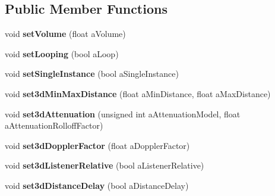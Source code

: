\subsection*{Public Member Functions}
\begin{DoxyCompactItemize}
\item 
\mbox{\label{class_so_loud_1_1_audio_source_a131aebb933216574269ce7f394b95b37}} 
void {\bfseries set\+Volume} (float a\+Volume)
\item 
\mbox{\label{class_so_loud_1_1_audio_source_ad62577bf3b28507cf00fec8122ed3699}} 
void {\bfseries set\+Looping} (bool a\+Loop)
\item 
\mbox{\label{class_so_loud_1_1_audio_source_a531a9b365bcfcf789f5b7ba187d80379}} 
void {\bfseries set\+Single\+Instance} (bool a\+Single\+Instance)
\item 
\mbox{\label{class_so_loud_1_1_audio_source_a2d9daeee1549be617f7e54038296ea1f}} 
void {\bfseries set3d\+Min\+Max\+Distance} (float a\+Min\+Distance, float a\+Max\+Distance)
\item 
\mbox{\label{class_so_loud_1_1_audio_source_a1c0cee35631865009ab32a30ed5c282c}} 
void {\bfseries set3d\+Attenuation} (unsigned int a\+Attenuation\+Model, float a\+Attenuation\+Rolloff\+Factor)
\item 
\mbox{\label{class_so_loud_1_1_audio_source_a4dfd2587466142df4d2633ef39f72929}} 
void {\bfseries set3d\+Doppler\+Factor} (float a\+Doppler\+Factor)
\item 
\mbox{\label{class_so_loud_1_1_audio_source_a886f886e285bc72719c1255409088525}} 
void {\bfseries set3d\+Listener\+Relative} (bool a\+Listener\+Relative)
\item 
\mbox{\label{class_so_loud_1_1_audio_source_a669e5d05c0ff5c4e55c6a19ac2660988}} 
void {\bfseries set3d\+Distance\+Delay} (bool a\+Distance\+Delay)
\item 
\mbox{\label{class_so_loud_1_1_audio_source_a4613f7463b4b8addb2a9e0622b9d4add}} 

\end{DoxyCompactItemize}
